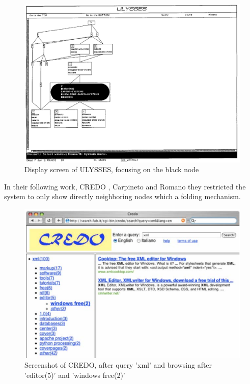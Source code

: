 \documentclass[11pt]{report}
\begin{document}
\begin{figure}[h]
\label{figure:ulysses}
	\centering
	\includegraphics[width=\linewidth]{images/ulysses}
\caption{Display screen of ULYSSES, focusing on the black node \cite{Carpineto1996} }
\end{figure}

In their following work, CREDO \cite{Carpineto2004}, Carpineto and Romano they restricted the system to only show directly neighboring nodes which a folding mechanism.

\begin{figure}[h]
\label{figure:credo}
	\centering
	\includegraphics[width=\linewidth]{images/credo}
\caption{Screenshot of CREDO, after query 'xml' and browsing after 'editor(5)' and 'windows free(2)' \cite{Carpineto2004} }
\end{figure} 
\end{document}
